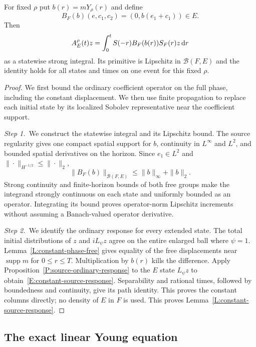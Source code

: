 \begin{lemma}\label{L:constant-source-response}
  For fixed $\rho$ put $b(r) = mY_\rho(r)$ and define
  \[
    B_F(b)(e,c_1,c_2)=(0,b(e_1+c_1))\in E.
  \]
  Then
  \begin{equation}\label{E:constant-source-response}
    A_E^\rho(t)z=\int_0^tS(-r)B_F(b(r))S_F(r)z\,\mathrm{d} r
  \end{equation}
  as a statewise strong integral. Its primitive is Lipschitz in
  $\mathcal{B}(F,E)$ and the identity holds for all states and times on one
  event for this fixed $\rho$.
\end{lemma}

\begin{proof}
  We first bound the ordinary coefficient operator on the full phase,
  including the constant displacement. We then use finite propagation to
  replace each initial state by its localized Sobolev representative near the
  coefficient support.

  \medskip
  \noindent\textit{Step 1.~}We construct the statewise integral and its
  Lipschitz bound.
  The source regularity gives one compact spatial support for $b$, continuity in
  $L^\infty$ and $L^2$, and bounded spatial derivatives on the horizon. Since
  $e_1 \in L^2$ and $\|\cdot\|_{H^{-1/2}} \le \|\cdot\|_2$,
  \[
    \|B_F(b)\|_{\mathcal{B}(F,E)}
    \le\|b\|_\infty+\|b\|_2.
  \]
  Strong continuity and finite-horizon bounds of both free groups make the
  integrand strongly continuous on each state and uniformly bounded as an
  operator. Integrating its bound proves operator-norm Lipschitz increments
  without assuming a Banach-valued operator derivative.

  \medskip
  \noindent\textit{Step 2.~}We identify the ordinary response for every
  extended state.
  The total initial distributions of $z$ and $iL_\psi z$ agree on the entire
  enlarged ball where $\psi = 1$. Lemma~\ref{L:constant-phase-free} gives
  equality of the free displacements near $\operatorname{supp}m$ for $0 \le r
  \le T$. Multiplication by $b(r)$ kills the difference. Apply
  Proposition~\ref{P:source-ordinary-response} to the $E$ state $L_\psi z$ to
  obtain~\eqref{E:constant-source-response}. Separability and rational times,
  followed by boundedness and continuity, give its path identity. This proves
  the constant columns directly; no density of $E$ in $F$ is used. This proves
  Lemma~\ref{L:constant-source-response}.
\end{proof}

\subsection{The exact linear Young equation}

